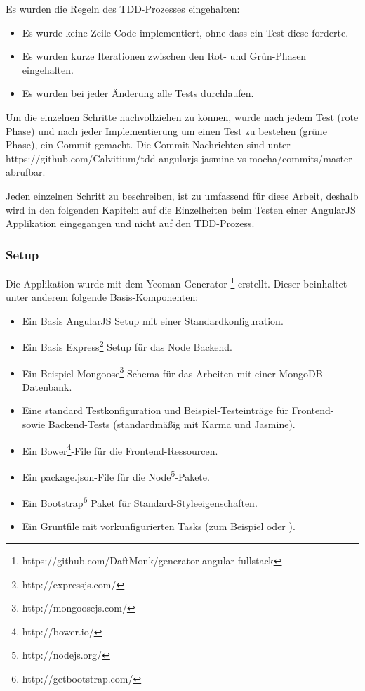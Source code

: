 Es wurden die Regeln des TDD-Prozesses eingehalten:
\begin{itemize}
  \item Es wurde keine Zeile Code implementiert, ohne dass ein Test diese forderte.
  \item Es wurden kurze Iterationen zwischen den Rot- und Grün-Phasen eingehalten.
  \item Es wurden bei jeder Änderung alle Tests durchlaufen.
\end{itemize}

Um die einzelnen Schritte nachvollziehen zu können, wurde nach jedem Test (rote Phase) und nach jeder Implementierung um einen Test zu bestehen (grüne Phase), ein Commit gemacht. Die Commit-Nachrichten sind unter https://github.com/Calvitium/tdd-angularjs-jasmine-vs-mocha/commits/master abrufbar.

Jeden einzelnen Schritt zu beschreiben, ist zu umfassend für diese Arbeit, deshalb wird in den folgenden Kapiteln auf die Einzelheiten beim Testen einer AngularJS Applikation eingegangen und nicht auf den TDD-Prozess.

\subsubsection{Setup}
Die Applikation wurde mit dem Yeoman Generator \footnote{https://github.com/DaftMonk/generator-angular-fullstack} erstellt. Dieser beinhaltet unter anderem folgende Basis-Komponenten:
\begin{itemize}
 \item Ein Basis AngularJS Setup mit einer Standardkonfiguration.
 \item Ein Basis Express\footnote{http://expressjs.com/} Setup für das Node Backend.
 \item Ein Beispiel-Mongoose\footnote{http://mongoosejs.com/}-Schema für das Arbeiten mit einer MongoDB Datenbank.
 \item Eine standard Testkonfiguration und Beispiel-Testeinträge für Frontend- sowie Backend-Tests (standardmäßig mit Karma und Jasmine).
 \item Ein Bower\footnote{http://bower.io/}-File für die Frontend-Ressourcen.
 \item Ein package.json-File für die Node\footnote{http://nodejs.org/}-Pakete.
 \item Ein Bootstrap\footnote{http://getbootstrap.com/} Paket für Standard-Styleeigenschaften.
 \item Ein Gruntfile mit vorkunfigurierten Tasks (zum Beispiel  oder ).
\end{itemize}

